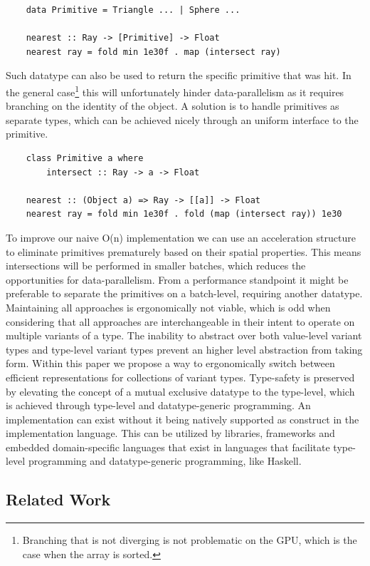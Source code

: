 \documentclass{article}
\begin{document}
\begin{verbatim}
    data Primitive = Triangle ... | Sphere ...

    nearest :: Ray -> [Primitive] -> Float
    nearest ray = fold min 1e30f . map (intersect ray)
\end{verbatim}

Such datatype can also be used to return the specific primitive that was hit. 
In the general case\footnote{Branching that is not diverging is not problematic on the GPU, which is the case when the array is sorted.} this will unfortunately hinder data-parallelism as it requires branching on the identity of the object.
A solution is to handle primitives as separate types, which can be achieved nicely through an uniform interface to the primitive.

\begin{verbatim}
    class Primitive a where
        intersect :: Ray -> a -> Float

    nearest :: (Object a) => Ray -> [[a]] -> Float
    nearest ray = fold min 1e30f . fold (map (intersect ray)) 1e30
\end{verbatim}

To improve our naive O(n) implementation we can use an acceleration structure to eliminate primitives prematurely based on their spatial properties.
This means intersections will be performed in smaller batches, which reduces the opportunities for data-parallelism.
From a performance standpoint it might be preferable to separate the primitives on a batch-level, requiring another datatype.
Maintaining all approaches is ergonomically not viable, which is odd when considering that all approaches are interchangeable in their intent to operate on multiple variants of a type.
The inability to abstract over both value-level variant types and type-level variant types prevent an higher level abstraction from taking form.
Within this paper we propose a way to ergonomically switch between efficient representations for collections of variant types.
Type-safety is preserved by elevating the concept of a mutual exclusive datatype to the type-level, which is achieved through type-level and datatype-generic programming.
An implementation can exist without it being natively supported as construct in the implementation language.
This can be utilized by libraries, frameworks and embedded domain-specific languages that exist in languages that facilitate type-level programming and datatype-generic programming, like Haskell.

\subsection{Related Work}
\end{document}
